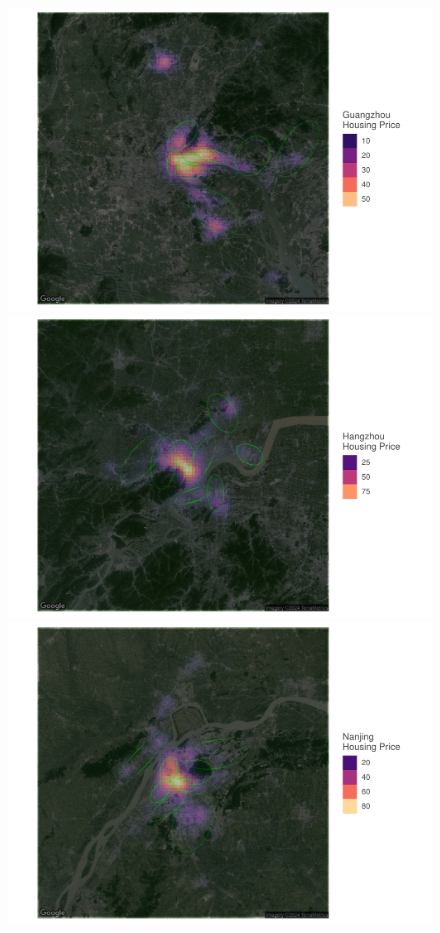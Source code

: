 \begin{figure}[h!]
    \begin{minipage}{0.328\textwidth}
        \includegraphics[width=\linewidth]{figures/distribution_of_hp_and_broker/Guangzhou.pdf}
    \end{minipage}
    \hfill
    \begin{minipage}{0.328\textwidth}
        \includegraphics[width=\linewidth]{figures/distribution_of_hp_and_broker/Hangzhou.pdf}
    \end{minipage}
    \begin{minipage}{0.328\textwidth}
        \includegraphics[width=\linewidth]{figures/distribution_of_hp_and_broker/Nanjing.pdf}

\end{minipage}
\end{figure}
